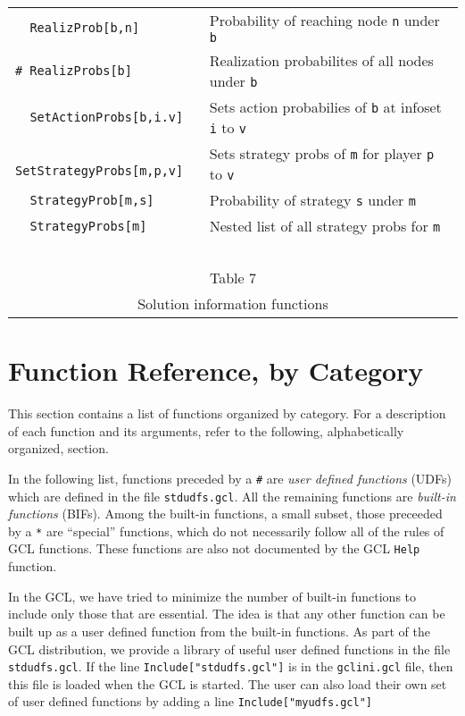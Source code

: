 \begin{table}[htp]
\begin{center}
\begin{tabular} {|l||l|}
\verb+  RealizProb[b,n]+ & Probability of reaching node \verb+n+ under \verb+b+\\
\verb+# RealizProbs[b]+ & Realization probabilites of all nodes under \verb+b+\\ 
\verb+  SetActionProbs[b,i.v]+ & Sets action probabilies of \verb+b+ at infoset \verb+i+ to \verb+v+\\
\verb+  SetStrategyProbs[m,p,v]+ & Sets strategy probs of \verb+m+ for
player \verb+p+ to \verb+v+\\
\verb+  StrategyProb[m,s]+ & Probability of strategy \verb+s+ under \verb+m+ \\
\verb+  StrategyProbs[m]+ & Nested list of all strategy probs for \verb+m+\\
\hline
\multicolumn{2}{c}{\ }\\
\multicolumn{2}{c}{Table 7}\\
\multicolumn{2}{c}{Solution information functions}\\
\end{tabular}
\end{center}
\end{table}
\medskip


\chapter{Function Reference, by Category}

This section contains a list of functions organized by
category.  For a description of each function and its arguments,
refer to the following, alphabetically organized, section.  

In the following list, functions preceded by a \verb+#+ are {\it user
defined functions} (UDFs) which are defined in the file
\verb+stdudfs.gcl+.  All the remaining functions are {\it built-in
functions} (BIFs).  Among the built-in functions, a small subset,
those preceeded by a \verb+*+ are ``special'' functions, which do not
necessarily follow all of the rules of GCL functions.  These functions
are also not documented by the GCL \verb+Help+ function.  

In the GCL, we have tried to minimize the number of built-in functions
to include only those that are essential.  The idea is that any other
function can be built up as a user defined function from the built-in
functions.  As part of the GCL distribution, we provide a library of
useful user defined functions in the file \verb+stdudfs.gcl+.  If the
line \verb+Include["stdudfs.gcl"]+ is in the \verb+gclini.gcl+ file,
then this file is loaded when the GCL is started.  The user can also
load their own set of user defined functions by adding a line
\verb+Include["myudfs.gcl"]+

